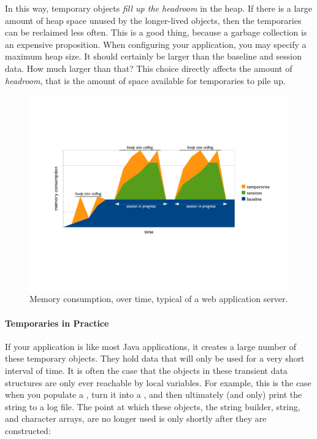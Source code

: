 In this way, temporary objects \emph{fill up the headroom} in the
heap. If there is a large amount of heap space unused by the
longer-lived objects, then the temporaries can be reclaimed less often. This is a
good thing, because a garbage collection is an expensive proposition.    When
configuring your application, you may specify a maximum heap size. It should
certainly be larger than the baseline and session data. How much larger than
that? This choice directly affects the amount of \emph{headroom}, that is the
amount of space available for temporaries to pile up.

\begin{figure}
	\centering
	\includegraphics[width=\textwidth]{part4/Figures/lifetime/timeline-base-session-temps}
	\caption{Memory consumption, over time, typical of a web application server.}
	\label{fig:timeline-base-session-temps}
\end{figure}

\paragraph{Temporaries in Practice}
If your application is like most Java applications, it creates a large number of
these temporary objects. They hold data that will only be used for a very short
interval of time. It is often the case that the objects in these transient data
structures are only ever reachable by local variables. For example, this is the
case when you populate a , turn it into a ,
and then ultimately (and only) print the string to a log file. The point at
which these objects, the string builder, string, and character arrays, are no
longer used is only shortly after they are constructed:

